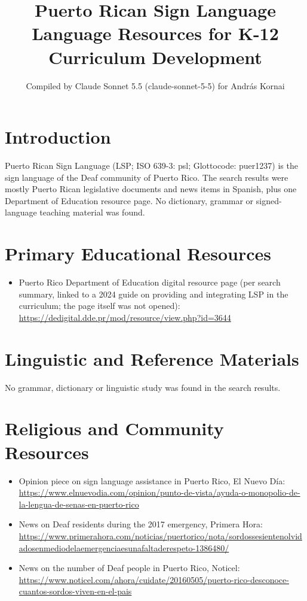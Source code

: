 \documentclass[12pt]{article}
\title{Puerto Rican Sign Language Language Resources for K-12 Curriculum Development}
\author{Compiled by Claude Sonnet 5.5 (claude-sonnet-5-5) for Andr\'as Kornai}
\date{}
\begin{document}
\maketitle

\section{Introduction}
Puerto Rican Sign Language (LSP; ISO 639-3: psl; Glottocode: puer1237) is the sign language of the Deaf community of Puerto Rico. The search results were mostly Puerto Rican legislative documents and news items in Spanish, plus one Department of Education resource page. No dictionary, grammar or signed-language teaching material was found.

\section{Primary Educational Resources}
\begin{itemize}
\item Puerto Rico Department of Education digital resource page (per search summary, linked to a 2024 guide on providing and integrating LSP in the curriculum; the page itself was not opened): \url{https://dedigital.dde.pr/mod/resource/view.php?id=3644}
\end{itemize}

\section{Linguistic and Reference Materials}
No grammar, dictionary or linguistic study was found in the search results.

\section{Religious and Community Resources}
\begin{itemize}
\item Opinion piece on sign language assistance in Puerto Rico, El Nuevo D\'ia: \url{https://www.elnuevodia.com/opinion/punto-de-vista/ayuda-o-monopolio-de-la-lengua-de-senas-en-puerto-rico}
\item News on Deaf residents during the 2017 emergency, Primera Hora: \url{https://www.primerahora.com/noticias/puertorico/nota/sordossesientenolvidadosenmediodelaemergenciaesunafaltaderespeto-1386480/}
\item News on the number of Deaf people in Puerto Rico, Noticel: \url{https://www.noticel.com/ahora/cuidate/20160505/puerto-rico-desconoce-cuantos-sordos-viven-en-el-pais}
\end{itemize}
\end{document}
